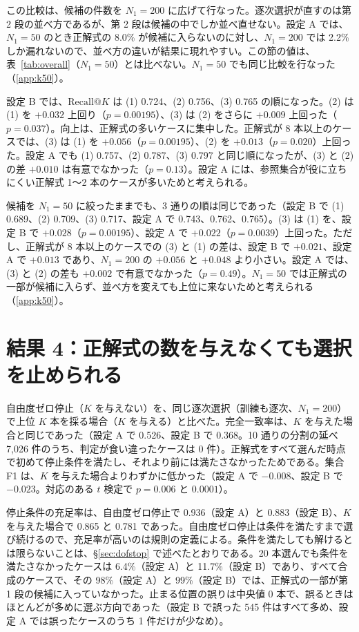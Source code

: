 \documentclass[a4j,dvipdfmx,11pt]{jresume}
\makeatletter
\newcommand{\rk}{\textrm{Recall@}K}
\makeatother
\begin{document}
この比較は、候補の件数を $N_1 = 200$ に広げて行なった。逐次選択が直すのは第 2 段の並べ方であるが、第 2 段は候補の中でしか並べ直せない。設定 A では、$N_1 = 50$ のとき正解式の 8.0\% が候補に入らないのに対し、$N_1 = 200$ では 2.2\% しか漏れないので、並べ方の違いが結果に現れやすい。この節の値は、表~\ref{tab:overall}（$N_1 = 50$）とは比べない。$N_1 = 50$ でも同じ比較を行なった（\ref{app:k50}）。

設定 B では、$\rk$ は (1) 0.724、(2) 0.756、(3) 0.765 の順になった。(2) は (1) を $+0.032$ 上回り（$p = 0.00195$）、(3) は (2) をさらに $+0.009$ 上回った（$p = 0.037$）。向上は、正解式の多いケースに集中した。正解式が 8 本以上のケースでは、(3) は (1) を $+0.056$（$p = 0.00195$）、(2) を $+0.013$（$p = 0.020$）上回った。設定 A でも (1) 0.757、(2) 0.787、(3) 0.797 と同じ順になったが、(3) と (2) の差 $+0.010$ は有意でなかった（$p = 0.13$）。設定 A には、参照集合が役に立ちにくい正解式 1〜2 本のケースが多いためと考えられる。

候補を $N_1 = 50$ に絞ったままでも、3 通りの順は同じであった（設定 B で (1) 0.689、(2) 0.709、(3) 0.717、設定 A で 0.743、0.762、0.765）。(3) は (1) を、設定 B で $+0.028$（$p = 0.00195$）、設定 A で $+0.022$（$p = 0.0039$）上回った。ただし、正解式が 8 本以上のケースでの (3) と (1) の差は、設定 B で $+0.021$、設定 A で $+0.013$ であり、$N_1 = 200$ の $+0.056$ と $+0.048$ より小さい。設定 A では、(3) と (2) の差も $+0.002$ で有意でなかった（$p = 0.49$）。$N_1 = 50$ では正解式の一部が候補に入らず、並べ方を変えても上位に来ないためと考えられる（\ref{app:k50}）。

\section{結果 4：正解式の数を与えなくても選択を止められる}\label{sec:dof}
自由度ゼロ停止（$K$ を与えない）を、同じ逐次選択（訓練も逐次、$N_1 = 200$）で上位 $K$ 本を採る場合（$K$ を与える）と比べた。完全一致率は、$K$ を与えた場合と同じであった（設定 A で 0.526、設定 B で 0.368。10 通りの分割の延べ 7{,}026 件のうち、判定が食い違ったケースは 0 件）。正解式をすべて選んだ時点で初めて停止条件を満たし、それより前には満たさなかったためである。集合 F1 は、$K$ を与えた場合よりわずかに低かった（設定 A で $-0.008$、設定 B で $-0.023$。対応のある $t$ 検定で $p = 0.006$ と $0.0001$）。

停止条件の充足率は、自由度ゼロ停止で 0.936（設定 A）と 0.883（設定 B）、$K$ を与えた場合で 0.865 と 0.781 であった。自由度ゼロ停止は条件を満たすまで選び続けるので、充足率が高いのは規則の定義による。条件を満たしても解けるとは限らないことは、\S\ref{sec:dofstop} で述べたとおりである。20 本選んでも条件を満たさなかったケースは 6.4\%（設定 A）と 11.7\%（設定 B）であり、すべて合成のケースで、その 98\%（設定 A）と 99\%（設定 B）では、正解式の一部が第 1 段の候補に入っていなかった。止まる位置の誤りは中央値 0 本で、誤るときはほとんどが多めに選ぶ方向であった（設定 B で誤った 545 件はすべて多め、設定 A では誤ったケースのうち 1 件だけが少なめ）。
\end{document}
